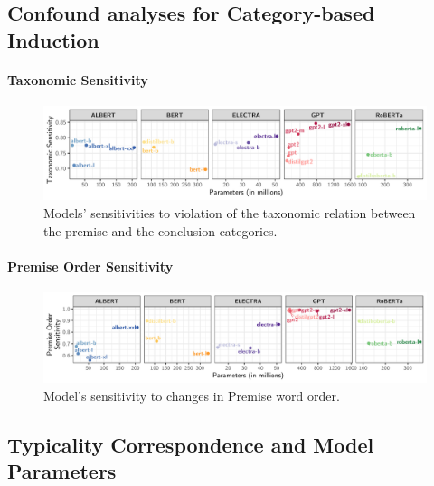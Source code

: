 \documentclass[a4paper, 11pt]{article}
\begin{document}
\subsection{Confound analyses for Category-based Induction}

\paragraph{Taxonomic Sensitivity}

\begin{figure}[h]
    \includegraphics[width = \textwidth]{../paper/ts_confound.pdf}
    \caption{Models' sensitivities to violation of the taxonomic relation between the premise and the conclusion categories.}
\end{figure}

\paragraph{Premise Order Sensitivity}

\begin{figure}[h]
    \includegraphics[width = \textwidth]{../paper/pos_confound.pdf}
    \caption{Model's sensitivity to changes in Premise word order.}
\end{figure}

\subsection{Typicality Correspondence and Model Parameters}



\end{document}
